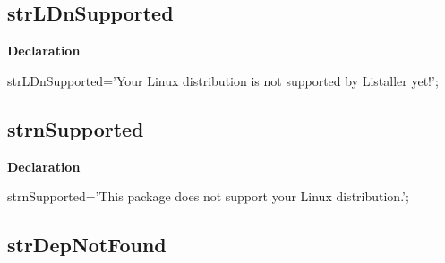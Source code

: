 \documentclass{report}
\newif\ifpdf
\begin{document}
\subsection*{strLDnSupported}
\fi
\label{trstrings-strLDnSupported}
\begin{list}{}{
\setlength{\itemindent}{0cm}
\setlength{\listparindent}{0cm}
\setlength{\leftmargin}{\evensidemargin}
\addtolength{\leftmargin}{\tmplength}
\settowidth{\labelsep}{X}
\addtolength{\leftmargin}{\labelsep}
\setlength{\labelwidth}{\tmplength}
}
\item[\textbf{Declaration}\hfill]
\ifpdf
\begin{flushleft}
\fi
\begin{ttfamily}
strLDnSupported='Your Linux distribution is not supported by Listaller yet!';\end{ttfamily}

\ifpdf
\end{flushleft}
\fi

\end{list}
\ifpdf
\subsection*{\large{\textbf{strnSupported}}\normalsize\hspace{1ex}\hrulefill}
\else
\subsection*{strnSupported}
\fi
\label{trstrings-strnSupported}
\begin{list}{}{
\setlength{\itemindent}{0cm}
\setlength{\listparindent}{0cm}
\setlength{\leftmargin}{\evensidemargin}
\addtolength{\leftmargin}{\tmplength}
\settowidth{\labelsep}{X}
\addtolength{\leftmargin}{\labelsep}
\setlength{\labelwidth}{\tmplength}
}
\item[\textbf{Declaration}\hfill]
\ifpdf
\begin{flushleft}
\fi
\begin{ttfamily}
strnSupported='This package does not support your Linux distribution.';\end{ttfamily}

\ifpdf
\end{flushleft}
\fi

\end{list}
\ifpdf
\subsection*{\large{\textbf{strDepNotFound}}\normalsize\hspace{1ex}\hrulefill}
\else
\end{document}
